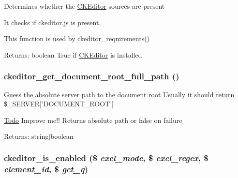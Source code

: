 Determines whether the \hyperlink{classCKEditor}{CKEditor} sources are present

It checks if ckeditor.js is present.

This function is used by ckeditor\_\-requirements()

\begin{Desc}
\item[Returns:]boolean True if \hyperlink{classCKEditor}{CKEditor} is installed \end{Desc}
\hypertarget{ckeditor_8lib_8inc_2b8784ee84340eb14aa10e274f660fa6}{
\subsubsection[{ckeditor\_\-get\_\-document\_\-root\_\-full\_\-path}]{\setlength{\rightskip}{0pt plus 5cm}ckeditor\_\-get\_\-document\_\-root\_\-full\_\-path ()}}
\label{ckeditor_8lib_8inc_2b8784ee84340eb14aa10e274f660fa6}


Guess the absolute server path to the document root Usually it should return \$\_\-SERVER\mbox{[}'DOCUMENT\_\-ROOT'\mbox{]}

\begin{Desc}
\item[\hyperlink{todo__todo000003}{Todo}]Improve me!! Returns absolute path or false on failure\end{Desc}
\begin{Desc}
\item[Returns:]string$|$boolean \end{Desc}
\hypertarget{ckeditor_8lib_8inc_5d7f963bc08132ffd4cb55061e4e8a21}{
\subsubsection[{ckeditor\_\-is\_\-enabled}]{\setlength{\rightskip}{0pt plus 5cm}ckeditor\_\-is\_\-enabled (\$ {\em excl\_\-mode}, \/  \$ {\em excl\_\-regex}, \/  \$ {\em element\_\-id}, \/  \$ {\em get\_\-q})}}
\label{ckeditor_8lib_8inc_5d7f963bc08132ffd4cb55061e4e8a21}


